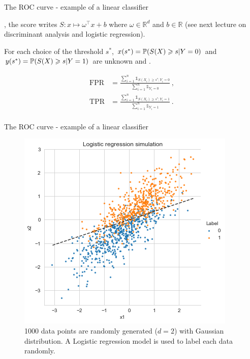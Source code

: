 \documentclass[xcolor={usenames,dvipsnames},handout]{beamer}
\begin{document}
\begin{frame}{The ROC curve - example of a linear classifier}


, the score writes $S:x\mapsto \omega^\top x + b$ where $\omega\in\mathbb{R}^d$ and $b\in\mathbb{R}$ (see next lecture on {\color{Vert} discriminant analysis and logistic regression}). 

\vspace{.4cm}

For each choice of the threshold $s^*$,  $x(s^*) = \P ( S(X)\geq s| Y=0) $  and $y(s^*) = \P (S(X) \geq s | Y=1)$ are unknown and .


\vspace{.3cm}

\begin{align*}
\mathrm{FPR} &= \frac{\sum_{i=1}^n \mathds{1}_{S(X_i)\geq s^* ; Y_i = 0}}{\sum_{i=1}^n \mathds{1}_{Y_i = 0}}\,,\\
\mathrm{TPR} &= \frac{\sum_{i=1}^n \mathds{1}_{S(X_i)\geq s^* ; Y_i = 1}}{\sum_{i=1}^n \mathds{1}_{Y_i = 1}}\,.\\
\end{align*}


\end{frame}


\begin{frame}{The ROC curve - example of a linear classifier}

\begin{figure}[h]
		\center
		\includegraphics[height=0.75\textheight]{log_reg}
		\caption{1000 data points are randomly generated ($d=2$) with Gaussian distribution. A Logistic regression model is used to label each data randomly. }
		\label{fig:roc}
	\end{figure}
\end{frame}
\end{document}
